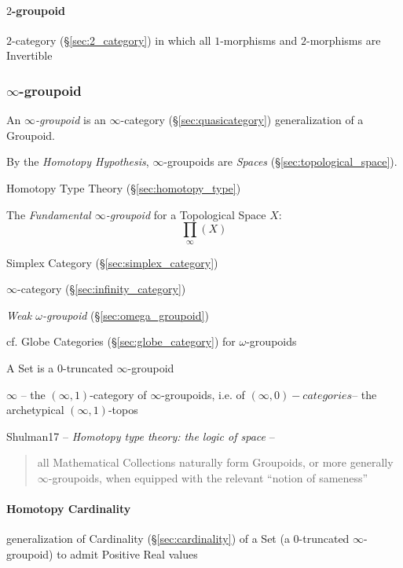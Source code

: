 \paragraph{$2$-groupoid}\label{sec:2_groupoid}\hfill

$2$-category (\S\ref{sec:2_category}) in which all $1$-morphisms and
$2$-morphisms are Invertible



\subsubsection{$\infty$-groupoid}\label{sec:infinity_groupoid}

An \emph{$\infty$-groupoid} is an $\infty$-category
(\S\ref{sec:quasicategory}) generalization of a Groupoid.

By the \emph{Homotopy Hypothesis}, $\infty$-groupoids are \emph{Spaces}
(\S\ref{sec:topological_space}).

Homotopy Type Theory (\S\ref{sec:homotopy_type})

The \emph{Fundamental $\infty$-groupoid} for a Topological Space $X$:
\[
  \prod_\infty(X)
\]

Simplex Category (\S\ref{sec:simplex_category})

\fist $\infty$-category (\S\ref{sec:infinity_category})

\emph{Weak $\omega$-groupoid} (\S\ref{sec:omega_groupoid})

\fist cf. Globe Categories (\S\ref{sec:globe_category}) for
$\omega$-groupoids

A Set is a $0$-truncated $\infty$-groupoid %

$\infty$ -- the $(\infty,1)$-category of $\infty$-groupoids,
i.e. of $(\infty,0)-categories$-- the archetypical
$(\infty,1)$-topos %

Shulman17 -- \emph{Homotopy type theory: the logic of space} --
\begin{quote}
all Mathematical Collections naturally form Groupoids, or more
generally $\infty$-groupoids, when equipped with the relevant ``notion
of sameness''
\end{quote}



\paragraph{Homotopy Cardinality}\label{sec:homotopy_cardinality}\hfill

generalization of Cardinality (\S\ref{sec:cardinality}) of a Set (a
$0$-truncated $\infty$-groupoid) to admit Positive Real values

